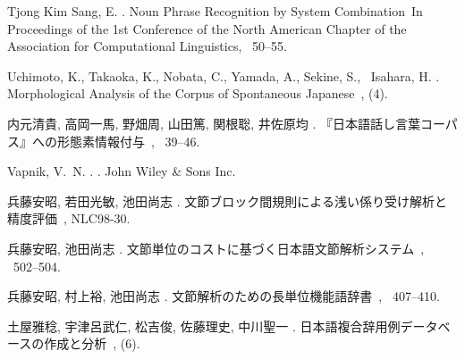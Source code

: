 \documentclass[japanese]{jnlp_1.2d}
\begin{document}
\begin{thebibliography}{}
{Tjong Kim Sang}, E. \BBCP.
\newblock \BBOQ Noun Phrase Recognition by System Combination\BBCQ\
\newblock In {\Bem Proceedings of the 1st Conference of the North American
  Chapter of the Association for Computational Linguistics}, \BPGS\ 50--55.

Uchimoto, K., Takaoka, K., Nobata, C., Yamada, A., Sekine, S., \BBA\ Isahara,
  H. \BBOP 2004\BBCP.
\newblock \BBOQ Morphological Analysis of the Corpus of Spontaneous
  Japanese\BBCQ\
, {}
  (4).

内元清貴, 高岡一馬, 野畑周, 山田篤, 関根聡, 井佐原均 \BBCP.
\newblock \JBOQ 『日本語話し言葉コーパス』への形態素情報付与\JBCQ\
\newblock {}, \BPGS\
  39--46.

Vapnik, V.~N. \BBCP.
.
\newblock John Wiley \& Sons Inc.

兵藤安昭, 若田光敏, 池田尚志 \BBOP 1998\BBCP.
\newblock \JBOQ 文節ブロック間規則による浅い係り受け解析と精度評価\JBCQ\
\newblock {}, NLC98-30\JVOL.

兵藤安昭, 池田尚志 \BBOP 1999\BBCP.
\newblock \JBOQ 文節単位のコストに基づく日本語文節解析システム\JBCQ\
\newblock {}, \BPGS\ 502--504.

兵藤安昭, 村上裕, 池田尚志 \BBCP.
\newblock \JBOQ 文節解析のための長単位機能語辞書\JBCQ\
\newblock {}, \BPGS\ 407--410.


    土屋雅稔, 宇津呂武仁, 松吉俊, 佐藤理史, 中川聖一 \BBOP 2006\BBCP.
\newblock \JBOQ 日本語複合辞用例データベースの作成と分析\JBCQ\
\newblock {}, {}  (6).


\end{thebibliography}
\end{document}
